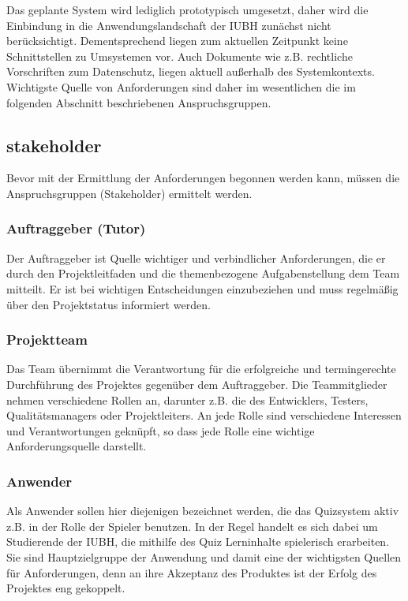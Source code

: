 \documentclass[a4paper,11pt,listof=numbered,glossary=totoc,parskip=half,toc=bib]{scrreprt}
\begin{document}
{Das geplante System wird lediglich prototypisch umgesetzt, daher wird die Einbindung in die Anwendungslandschaft der IUBH zunächst nicht berücksichtigt.
Dementsprechend liegen zum aktuellen Zeitpunkt keine Schnittstellen zu Umsystemen vor.
Auch Dokumente wie z.B. rechtliche Vorschriften zum Datenschutz, liegen aktuell außerhalb des Systemkontexts.
Wichtigste Quelle von Anforderungen sind daher im wesentlichen die im folgenden Abschnitt beschriebenen Anspruchsgruppen.

\subsection{\Gls{stakeholder}}

Bevor mit der Ermittlung der Anforderungen begonnen werden kann, müssen die Anspruchsgruppen (Stakeholder) ermittelt werden.

\subsubsection{Auftraggeber (Tutor)}

Der Auftraggeber ist Quelle wichtiger und verbindlicher Anforderungen, die er durch den Projektleitfaden und die themenbezogene Aufgabenstellung dem Team mitteilt.
Er ist bei wichtigen Entscheidungen einzubeziehen und muss regelmäßig über den Projektstatus informiert werden.

\subsubsection{Projektteam}

Das Team übernimmt die Verantwortung für die erfolgreiche und termingerechte Durchführung des Projektes gegenüber dem Auftraggeber.
Die Teammitglieder nehmen verschiedene Rollen an, darunter z.B. die des Entwicklers, Testers, Qualitätsmanagers oder Projektleiters. 
An jede Rolle sind verschiedene Interessen und Verantwortungen geknüpft, so dass jede Rolle eine wichtige Anforderungsquelle darstellt.

\subsubsection{Anwender}

Als Anwender sollen hier diejenigen bezeichnet werden, die das Quizsystem aktiv z.B. in der Rolle der Spieler benutzen. In der Regel handelt es sich dabei um Studierende der IUBH, die mithilfe des Quiz Lerninhalte spielerisch erarbeiten. 
Sie sind Hauptzielgruppe der Anwendung und damit eine der wichtigsten Quellen für Anforderungen, denn an ihre Akzeptanz des Produktes ist der Erfolg des Projektes eng gekoppelt. 

}
\end{document}
